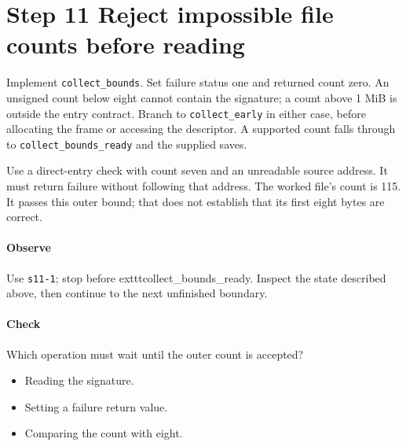 \section{Step 11 Reject impossible file counts before reading}\label{png-collect-s11}
Implement \texttt{collect\_bounds}. Set failure status one and returned count zero. An unsigned count below eight cannot contain the signature; a count above 1 MiB is outside the entry contract. Branch to \texttt{collect\_early} in either case, before allocating the frame or accessing the descriptor. A supported count falls through to \texttt{collect\_bounds\_ready} and the supplied saves.

Use a direct-entry check with count seven and an unreadable source address. It must return failure without following that address. The worked file's count is 115. It passes this outer bound; that does not establish that its first eight bytes are correct.

\paragraph{Observe} Use \texttt{s11-1}; stop before 	exttt{collect\_bounds\_ready}. Inspect the state described above, then continue to the next unfinished boundary.

\paragraph{Check} Which operation must wait until the outer count is accepted?
\begin{itemize}
\item[A.] Reading the signature.
\item[B.] Setting a failure return value.
\item[C.] Comparing the count with eight.
\end{itemize}
